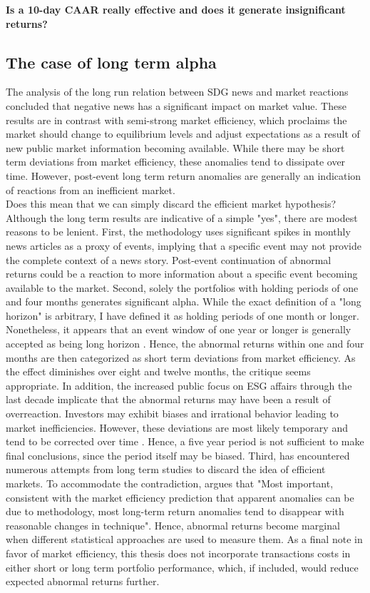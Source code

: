 \textbf{Is a 10-day CAAR really effective and does it generate insignificant returns?}

\subsection{The case of long term alpha}

The analysis of the long run relation between SDG news and market reactions concluded that negative news has a significant impact on market value. These results are in contrast with semi-strong market efficiency, which proclaims the market should change to equilibrium levels and adjust expectations as a result of new public market information becoming available. While there may be short term deviations from market efficiency, these anomalies tend to dissipate over time. However, post-event long term return anomalies are generally an indication of reactions from an inefficient market. \\
Does this mean that we can simply discard the efficient market hypothesis? Although the long term results are indicative of a simple "yes", there are modest reasons to be lenient. First, the methodology uses significant spikes in monthly news articles as a proxy of events, implying that a specific event may not provide the complete context of a news story. Post-event continuation of abnormal returns could be a reaction to more information about a specific event becoming available to the market. Second, solely the portfolios with holding periods of one and four months generates significant alpha. While the exact definition of a "long horizon" is arbitrary, I have defined it as holding periods of one month or longer. Nonetheless, it appears that  an event window of one year or longer is generally accepted as being long horizon \cite{kothari}. Hence, the abnormal returns within one and four months are then categorized as short term deviations from market efficiency. As the effect diminishes over eight and twelve months, the critique seems appropriate.
In addition, the increased public focus on ESG affairs through the last decade implicate that the abnormal returns may have been a result of overreaction. Investors may exhibit biases and irrational behavior leading to market inefficiencies. However, these deviations are most likely temporary and tend to be corrected over time \citep{fama1998_events}. Hence, a five year period is not sufficient to make final conclusions, since the period itself may be biased. Third, \citeauthor{fama1998_events} has encountered numerous attempts from long term studies to discard the idea of efficient markets. To accommodate the contradiction, \citeauthor{fama1998_events} argues that "Most important, consistent with the market efficiency prediction that apparent anomalies can be due to methodology, most long-term return anomalies tend to disappear with reasonable changes in technique". Hence, abnormal returns become marginal when different statistical approaches are used to measure them. As a final note in favor of market efficiency, this thesis does not incorporate transactions costs in either short or long term portfolio performance, which, if included, would reduce expected abnormal returns further. 

